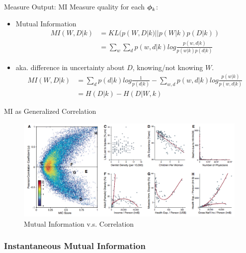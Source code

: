 \documentclass{beamer}
\begin{document}
\begin{frame}{Measure Output: MI}
Measure quality for each $\boldsymbol{\phi}_k$: 
\begin{itemize}[<+->]
\item Mutual Information
\begin{align*}
MI (W, D|k) &= KL(p(W, D|k) || p(W|k)p(D|k))\\
&= \sum_w \sum_d p(w, d|k) log \frac{p(w, d|k) }{p(w|k)p(d|k) }
\end{align*}
\item aka. difference in uncertainty about $D$, knowing/not knowing $W$.
\begin{align*}
MI (W, D|k) &= 
\sum_d p(d|k)log\frac{1}{ p(d|k)} - 
\sum_{w,d} p(w, d|k)log\frac{p(w|k)}{ p(w, d | k)}
\\
&= H(D|k) - H(D|W, k)
\end{align*}
\end{itemize}

\end{frame}

\begin{frame}{MI as Generalized Correlation}
\begin{figure}
    \centering
    \includegraphics[width = \linewidth]{"./plot/MI"}
    \caption{Mutual Information v.s. Correlation}
    \label{fig:MI}
\end{figure}
\end{frame}

\subsubsection{Instantaneous Mutual Information} 
\end{document}

